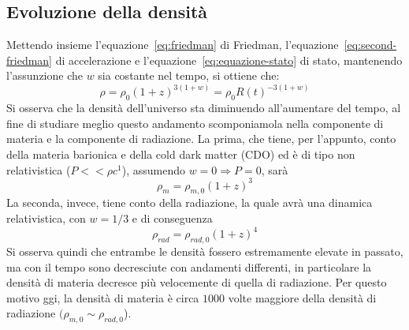 \subsection{Evoluzione della densità}\label{sec:evoluazione-densita}
Mettendo insieme l'equazione~\ref{eq:friedman} di Friedman, l'equazione~\ref{eq:second-friedman} di accelerazione e l'equazione~\ref{eq:equazione-stato} di stato, mantenendo l'assunzione che $w$ sia costante nel tempo, si ottiene che:
\[
    \rho = \rho_0 (1+z)^{3(1+w)} = \rho_0 R(t)^{-3(1+w)}
\]
Si osserva che la densità dell'universo sta diminuendo all'aumentare del tempo, al fine di studiare meglio questo andamento scomponiamola nella componente di materia e la componente di radiazione. La prima, che tiene, per l'appunto, conto della materia barionica e della cold dark matter (CDO) ed è di tipo non relativistica ($P<<\rho c^1$), assumendo $w = 0 \Rightarrow P=0$, sarà
\[
    \rho_m = \rho_{m,0}(1+z)^3
\]
La seconda, invece, tiene conto della radiazione, la quale avrà una dinamica relativistica, con $w = 1/3$ e di conseguenza
\[
    \rho_{rad} = \rho_{rad, 0}(1+z)^4
\]
Si osserva quindi che entrambe le densità fossero estremamente elevate in passato, ma con il tempo sono decresciute con andamenti differenti, in particolare la densità di materia decresce più velocemente di quella di radiazione. Per questo motivo ggi, la densità di materia è circa $1000$ volte maggiore della densità di radiazione $(\rho_{m,0} \sim \rho_{rad, 0}$).